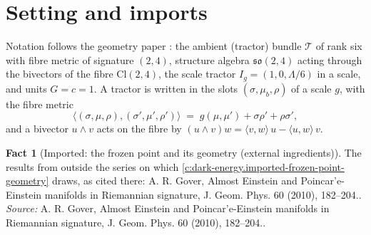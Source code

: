 \documentclass[11pt]{article}
\theoremstyle{definition}
\newtheorem{fact}[theorem]{Fact}
\theoremstyle{plain}
\providecommand{\Cl}{}\renewcommand{\Cl}{\mathrm{Cl}}
\providecommand{\ip}{}\renewcommand{\ip}[2]{\langle #1, #2\rangle}
\begin{document}
\section{Setting and imports}

\label{c:note.dark-energy.setting-setting-imports}
Notation follows the geometry paper \cite{ButlerT6}: the ambient (tractor) bundle $\mathcal{T}$ of rank six with fibre metric of signature $(2,4)$, structure algebra $\mathfrak{so}(2,4)$ acting through the bivectors of the fibre $\Cl(2,4)$, the scale tractor $I_g = (1, 0, \Lambda/6)$ in a scale, and units $G = c = 1$. A tractor is written in the slots $(\sigma, \mu_b, \rho)$ of a scale $g$, with the fibre metric
\begin{equation}
\ip{(\sigma,\mu,\rho)}{(\sigma',\mu',\rho')} \;=\; g(\mu,\mu') + \sigma\rho' + \rho\sigma' ,
\end{equation}
and a bivector $u\wedge v$ acts on the fibre by $(u\wedge v)w = \ip{v}{w}\,u - \ip{u}{w}\,v$.

\begin{fact}[Imported: the frozen point and its geometry (external ingredients)]\label{c:dark-energy.imported-frozen-point-geometry-external}
The results from outside the series on which \ref{c:dark-energy.imported-frozen-point-geometry} draws, as cited there: A. R. Gover, Almost Einstein and Poincar'e-Einstein manifolds in Riemannian signature, J. Geom. Phys. 60 (2010), 182--204..
\emph{Source:} A. R. Gover, Almost Einstein and Poincar'e-Einstein manifolds in Riemannian signature, J. Geom. Phys. 60 (2010), 182--204..
\end{fact}
\end{document}
